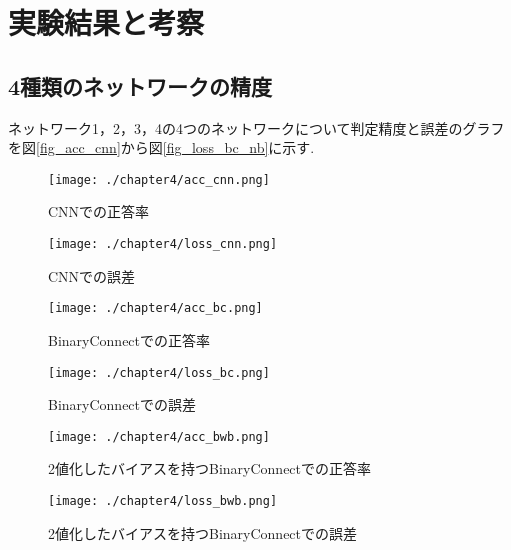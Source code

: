\chapter{実験結果と考察}

\section{4種類のネットワークの精度}
ネットワーク1，2，3，4の4つのネットワークについて判定精度と誤差のグラフを図\ref{fig_acc_cnn}から図\ref{fig_loss_bc_nb}に示す.
\begin{figure}[htbp]
  \begin{minipage}[b]{0.45\linewidth}
    \centering
    \texttt{[image: ./chapter4/acc\_cnn.png]}
    \caption{CNNでの正答率}
    \label{fig_acc_cnn}
  \end{minipage}
  \begin{minipage}[b]{0.45\linewidth}
    \centering
    \texttt{[image: ./chapter4/loss\_cnn.png]}
    \caption{CNNでの誤差}
    \label{fig_loss_cnn}
  \end{minipage}
\end{figure}

\begin{figure}[htbp]
  \begin{minipage}[b]{0.45\linewidth}
    \centering
    \texttt{[image: ./chapter4/acc\_bc.png]}
    \caption{BinaryConnectでの正答率}
    \label{fig_acc_bc}
  \end{minipage}
  \begin{minipage}[b]{0.45\linewidth}
    \centering
    \texttt{[image: ./chapter4/loss\_bc.png]}
    \caption{BinaryConnectでの誤差}
    \label{fig_loss_bc}
  \end{minipage}
\end{figure}

\begin{figure}[htbp]
  \begin{minipage}[b]{0.45\linewidth}
    \centering
    \texttt{[image: ./chapter4/acc\_bwb.png]}
    \caption{2値化したバイアスを持つBinaryConnectでの正答率}
    \label{fig_acc_bwb}
  \end{minipage}
  \begin{minipage}[b]{0.45\linewidth}
    \centering
    \texttt{[image: ./chapter4/loss\_bwb.png]}
    \caption{2値化したバイアスを持つBinaryConnectでの誤差}
    \label{fig_loss_bwb}
  \end{minipage}
\end{figure}

